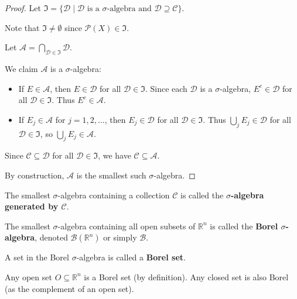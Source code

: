 \documentclass[11pt]{report}
\begin{document}
\begin{proof}
Let $\mathfrak{I} = \{\mathcal{D} \mid \mathcal{D} \text{ is a } \sigma\text{-algebra and } \mathcal{D} \supseteq \mathcal{C}\}$.

Note that $\mathfrak{I} \neq \emptyset$ since $\mathcal{P}(X) \in \mathfrak{I}$.

Let $\mathcal{A} = \bigcap_{\mathcal{D} \in \mathfrak{I}} \mathcal{D}$.

We claim $\mathcal{A}$ is a $\sigma$-algebra:
\begin{itemize}
    \item If $E \in \mathcal{A}$, then $E \in \mathcal{D}$ for all $\mathcal{D} \in \mathfrak{I}$. Since each $\mathcal{D}$ is a $\sigma$-algebra, $E^c \in \mathcal{D}$ for all $\mathcal{D} \in \mathfrak{I}$. Thus $E^c \in \mathcal{A}$.
    \item If $E_j \in \mathcal{A}$ for $j = 1, 2, \ldots$, then $E_j \in \mathcal{D}$ for all $\mathcal{D} \in \mathfrak{I}$. Thus $\bigcup_j E_j \in \mathcal{D}$ for all $\mathcal{D} \in \mathfrak{I}$, so $\bigcup_j E_j \in \mathcal{A}$.
\end{itemize}

Since $\mathcal{C} \subseteq \mathcal{D}$ for all $\mathcal{D} \in \mathfrak{I}$, we have $\mathcal{C} \subseteq \mathcal{A}$.

By construction, $\mathcal{A}$ is the smallest such $\sigma$-algebra.
\end{proof}

\begin{defbox}
The smallest $\sigma$-algebra containing a collection $\mathcal{C}$ is called the \textbf{$\sigma$-algebra generated by $\mathcal{C}$}.
\end{defbox}

\begin{defbox}
The smallest $\sigma$-algebra containing all open subsets of $\mathbb{R}^n$ is called the \textbf{Borel $\sigma$-algebra}, denoted $\mathcal{B}(\mathbb{R}^n)$ or simply $\mathcal{B}$.

A set in the Borel $\sigma$-algebra is called a \textbf{Borel set}.
\end{defbox}

\begin{exbox}
Any open set $O \subseteq \mathbb{R}^n$ is a Borel set (by definition). Any closed set is also Borel (as the complement of an open set).
\end{exbox}
\end{document}
